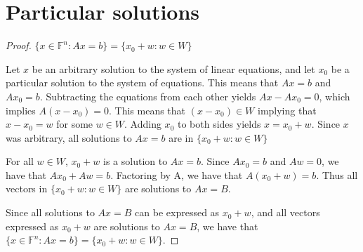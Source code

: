 \section{Particular solutions}
\begin{proof}$\{x \in \mathbb{F}^n : Ax=b\} = \{x_0+w : w \in W\}$\gap
    
    Let $x$ be an arbitrary solution to the system of linear equations, and
    let $x_0$ be a particular solution to the system of equations.
    This means that $Ax=b$ and $Ax_0=b$.
    Subtracting the equations from each other yields 
    $Ax - Ax_0 = 0$, which implies $A(x-x_0) = 0$.
    This means that $(x-x_0) \in W$ implying that
    $x-x_0 = w$ for some $w \in W$.
    Adding $x_0$ to both sides yields $x = x_0 + w$.
    Since $x$ was arbitrary, all solutions to $Ax=b$ are in $\{x_0+w : w \in W\}$\gap

    For all $w \in W$, $x_0+w$ is a solution to $Ax=b$.
    Since $Ax_0 = b$ and $Aw=0$, we have that $Ax_0 + Aw = b$.
    Factoring by A, we have that $A(x_0+w) = b$.
    Thus all vectors in $\{x_0+w : w \in W\}$ are solutions to $Ax=B$.\gap

    Since all solutions to $Ax=B$ can be expressed as $x_0+w$,
    and all vectors expressed as $x_0+w$ are solutions to $Ax=B$,
    we have that $\{x \in \mathbb{F}^n : Ax=b\} = \{x_0+w : w \in W\}$.
\end{proof}